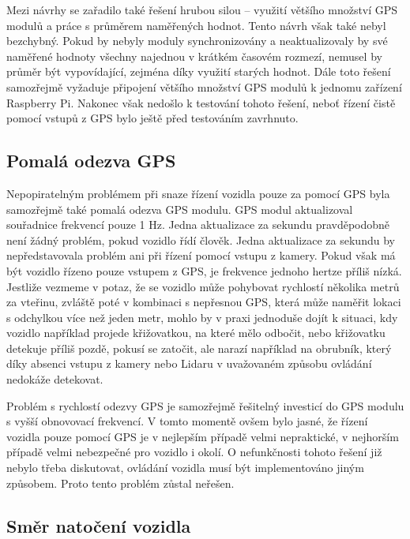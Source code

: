 \documentclass[czech, bachelor]{diploma}
\begin{document}
Mezi návrhy se zařadilo také řešení hrubou silou -- využití většího množství GPS modulů a práce s průměrem naměřených hodnot. 
Tento návrh však také nebyl bezchybný. Pokud by nebyly moduly synchronizovány a neaktualizovaly by své naměřené hodnoty všechny 
najednou v krátkém časovém rozmezí, nemusel by průměr být vypovídající, zejména díky využití starých hodnot. Dále toto řešení
samozřejmě vyžaduje připojení většího množství GPS modulů k jednomu zařízení Raspberry Pi. Nakonec však nedošlo k testování tohoto
řešení, neboť řízení čistě pomocí vstupů z GPS bylo ještě před testováním zavrhnuto.

\subsection{Pomalá odezva GPS} \label{gps-low-polling-rate}

Nepopiratelným problémem při snaze řízení vozidla pouze za pomocí GPS byla samozřejmě také pomalá odezva GPS modulu. GPS modul
aktualizoval souřadnice frekvencí pouze 1 Hz. Jedna aktualizace za sekundu pravděpodobně není žádný problém, pokud vozidlo řídí
člověk. Jedna aktualizace za sekundu by nepředstavovala problém ani při řízení pomocí vstupu z kamery. Pokud však má být vozidlo
řízeno pouze vstupem z GPS, je frekvence jednoho hertze příliš nízká. Jestliže vezmeme v potaz, že se vozidlo může pohybovat
rychlostí několika metrů za vteřinu, zvláště poté v kombinaci s nepřesnou GPS, která může naměřit lokaci s odchylkou více než
jeden metr, mohlo by v praxi jednoduše dojít k situaci, kdy vozidlo například projede křižovatkou, na které mělo odbočit, nebo
křižovatku detekuje příliš pozdě, pokusí se zatočit, ale narazí například na obrubník, který díky absenci vstupu z kamery nebo
Lidaru v uvažovaném způsobu ovládání nedokáže detekovat.

Problém s rychlostí odezvy GPS je samozřejmě řešitelný investicí do GPS modulu s vyšší obnovovací frekvencí. V tomto momentě ovšem
bylo jasné, že řízení vozidla pouze pomocí GPS je v nejlepším případě velmi nepraktické, v nejhorším případě velmi nebezpečné
pro vozidlo i okolí. O nefunkčnosti tohoto řešení již nebylo třeba diskutovat, ovládání vozidla musí být implementováno jiným
způsobem. Proto tento problém zůstal neřešen.

\subsection{Směr natočení vozidla} \label{directions-and-angles}
\end{document}
